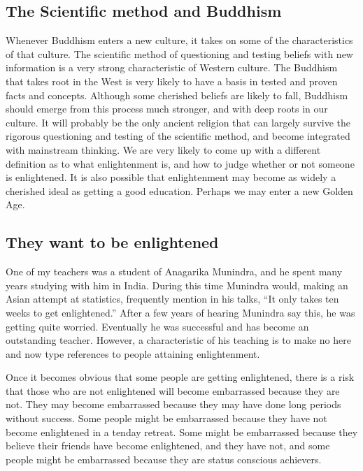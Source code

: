 \documentclass[a5paper,10pt,english]{book}
\begin{document}
\subsection{The Scientific method and Buddhism}
\label{\detokenize{saints:the-scientific-method-and-buddhism}}
\sphinxAtStartPar
Whenever Buddhism enters a new culture, it takes on some of the
characteristics of that culture. The scientific method of questioning
and testing beliefs with new information is a very strong characteristic
of Western culture. The Buddhism that takes root in the West is very
likely to have a basis in tested and proven facts and concepts. Although
some cherished beliefs are likely to fall, Buddhism should emerge from
this process much stronger, and with deep roots in our culture. It will
probably be the only ancient religion that can largely survive the
rigorous questioning and testing of the scientific method, and become
integrated with mainstream thinking. We are very likely to come up with
a different definition as to what enlightenment is, and how to judge
whether or not someone is enlightened. It is also possible that
enlightenment may become as widely a cherished ideal as getting a good
education. Perhaps we may enter a new Golden Age.


\subsection{They want to be enlightened}
\label{\detokenize{saints:they-want-to-be-enlightened}}
\sphinxAtStartPar
One of my teachers was a student of Anagarika Munindra, and he spent
many years studying with him in India. During this time Munindra would,
making an Asian attempt at statistics, frequently mention in his talks,
“It only takes ten weeks to get enlightened.” After a few years of
hearing Munindra say this, he was getting quite worried. Eventually he
was successful and has become an outstanding teacher. However, a
characteristic of his teaching is to make no here and now type
references to people attaining enlightenment.

\sphinxAtStartPar
Once it becomes obvious that some people are getting enlightened, there
is a risk that those who are not enlightened will become embarrassed
because they are not. They may become embarrassed because they may have
done long periods without success. Some people might be embarrassed
because they have not become enlightened in a ten\sphinxhyphen{}day retreat. Some
might be embarrassed because they believe their friends have become
enlightened, and they have not, and some people might be embarrassed
because they are status conscious achievers.
\end{document}
